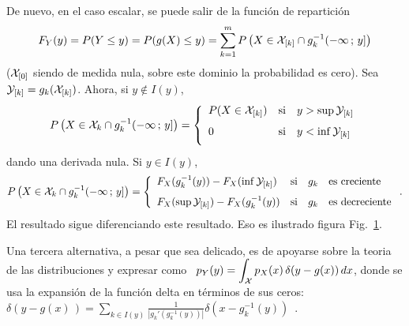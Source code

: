 De nuevo, en el caso escalar, se puede salir de la funci\'on de repartici\'on
%
\[
F_Y(y) =  P(Y \le y) = P(  g(X) \le y )  = \sum_{k=1}^m P\left( X  \in \mathcal{X}_{[k]} \cap
  g_k^{-1}(-\infty \, ; \, y] \right)
\]
%
($\mathcal{X}_{[0]}$  siendo  de medida  nula,  sobre  este  dominio la  probabilidad  es
cero). Sea $\mathcal{Y}_{[k]} = g_k(\mathcal{X}_{[k]})$. Ahora, si $y \not\in I(y)$,
%
\[
P\left(   X   \in  \X_k   \cap   g_k^{-1}(-\infty  \,   ;   \,   y]  \right)   =
\left\{\begin{array}{lll}
%
P(X \in \X_{[k]}) & \mbox{si} & y > \sup \Y_{[k]}\\[2.5mm]
%
0 & \mbox{si} & y < \inf \Y_{[k]}\\[2.5mm]
\end{array}\right.
\]
%
dando una derivada nula. Si $y \in I(y)$,
%
\[
P\left(   X   \in  \X_k   \cap   g_k^{-1}(-\infty  \,   ;   \,   y]  \right)   =
\left\{\begin{array}{lll}
%
F_X(g_k^{-1}(y)) - F_X(\inf \Y_{[k]}) & \mbox{si} & g_k \quad \mbox{es creciente}\\[2.5mm]
%
F_X(\sup \Y_{[k]}) - F_X(g_k^{-1}(y))  & \mbox{si} & g_k \quad \mbox{es decreciente}
\end{array}\right..
\]
%
El  resultado  sigue  diferenciando  este  resultado. Eso  es  ilustrado  figura
Fig.~\ref{Fig:MP:TransformacionVA}.

\begin{figure}[h!]
\begin{center}  \end{center}
%
\label{Fig:MP:TransformacionVA}
\end{figure}

Una  tercera alternativa,  a pesar  que sea  delicado, es  de apoyarse  sobre la
teoria de las  distribuciones y expresar como \  $\displaystyle p_Y(y) = \int_{\mathcal{X}}
p_X(x) \,  \delta(y-g(x)) \, dx$,  donde se usa  la expansi\'on de  la funci\'on
delta  en  t\'erminos de  sus  ceros:  \  $\delta(y-g(x)\,)= \sum_{k  \in  I(y)}
\frac{1}{\left|      g_k'\left(      g_k^{-1}      (y)     \right)      \right|}
\delta(x-g_k^{-1}(y))$~\cite{ManWol95}.

